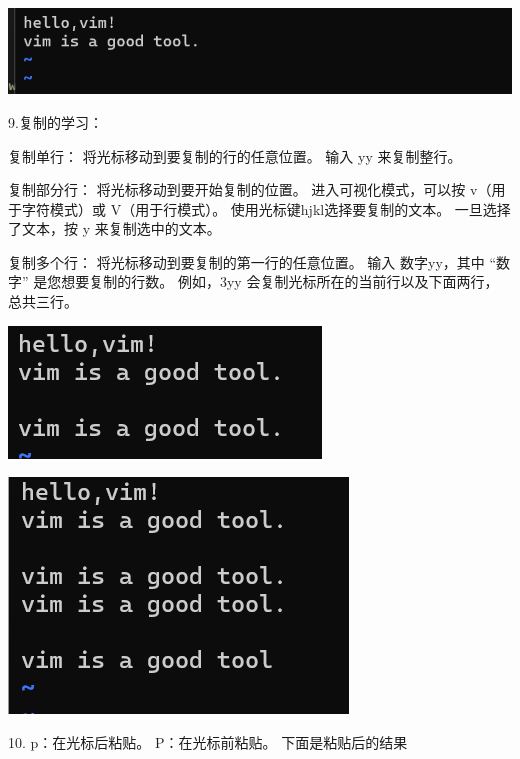\documentclass{article}
\begin{document}
	\begin{minipage}{\linewidth}
		\centering
		\includegraphics[width=0.5\linewidth]{example21.png}
		\label{fig:example}
	\end{minipage}
	
	
	9.复制的学习：
	
	复制单行：
	将光标移动到要复制的行的任意位置。
	输入 yy 来复制整行。
	
	复制部分行：
	将光标移动到要开始复制的位置。
	进入可视化模式，可以按 v（用于字符模式）或 V（用于行模式）。
	使用光标键hjkl选择要复制的文本。
	一旦选择了文本，按 y 来复制选中的文本。
	
	复制多个行：
	将光标移动到要复制的第一行的任意位置。
	输入 数字yy，其中 “数字” 是您想要复制的行数。
	例如，3yy 会复制光标所在的当前行以及下面两行，总共三行。
	
	\noindent
	\begin{minipage}{\linewidth}
		\centering
		\includegraphics[width=0.5\linewidth]{example22.png}
		\label{fig:example}
	\end{minipage}
	
	\noindent
	\begin{minipage}{\linewidth}
		\centering
		\includegraphics[width=0.5\linewidth]{example23.png}
		\label{fig:example}
	\end{minipage}
	
	
	10.
	p：在光标后粘贴。
	P：在光标前粘贴。
	下面是粘贴后的结果
	
\end{document}

